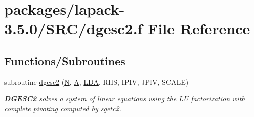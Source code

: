 \hypertarget{dgesc2_8f}{}\section{packages/lapack-\/3.5.0/\+S\+R\+C/dgesc2.f File Reference}
\label{dgesc2_8f}
\subsection*{Functions/\+Subroutines}
\begin{DoxyCompactItemize}
\item 
subroutine \hyperlink{group__doubleGEauxiliary_gac6998d2ed1a92cc28708602db64f3db6}{dgesc2} (\hyperlink{polmisc_8c_a0240ac851181b84ac374872dc5434ee4}{N}, \hyperlink{classA}{A}, \hyperlink{example__user_8c_ae946da542ce0db94dced19b2ecefd1aa}{L\+D\+A}, R\+H\+S, I\+P\+I\+V, J\+P\+I\+V, S\+C\+A\+L\+E)
\begin{DoxyCompactList}\small\item\em {\bfseries D\+G\+E\+S\+C2} solves a system of linear equations using the L\+U factorization with complete pivoting computed by sgetc2. \end{DoxyCompactList}\end{DoxyCompactItemize}
